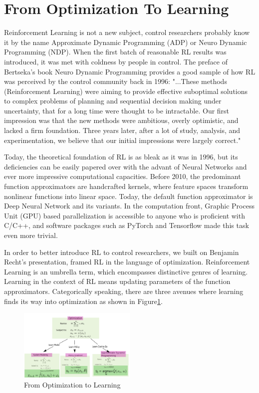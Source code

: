 \documentclass[journal]{IEEEtran}
\begin{document}
\section{From Optimization To Learning}

Reinforcement Learning is not a new subject, control researchers probably know it by the name Approximate Dynamic Programming (ADP) or Neuro Dynamic Programming (NDP). When the first batch of reasonable RL results was introduced, it was met with coldness by people in control. The preface of Bertseka's book Neuro Dynamic Programming provides a good sample of how RL was perceived by the control community back in 1996: "...These methods (Reinforcement Learning) were aiming to provide effective suboptimal solutions to complex problems of planning and sequential decision making under uncertainty, that for a long time were thought to be intractable. Our first impression was that the new methods were ambitious, overly optimistic, and lacked a firm foundation. Three years later, after a lot of study, analysis, and experimentation, we believe that our initial impressions were largely correct." \cite{Bertsekas1996NeuroDynamicP}

Today, the theoretical foundation of RL is as bleak as it was in 1996, but its deficiencies can be easily papered over with the advant of Neural Networks and ever more impressive computational capacities. Before 2010, the predominant function approximators are handcrafted kernels, where feature spaces transform nonlinear functions into linear space. Today, the default function approximator is Deep Neural Network and its variants. In the computation front, Graphic Process Unit (GPU) based parallelization is accessible to anyone who is proficient with C/C++\cite{Nickolls2008ScalablePP}, and software packages such as PyTorch\cite{Paszke2017AutomaticDI} and Tensorflow\cite{Abadi2016TensorFlowAS} made this task even more trivial.

In order to better introduce RL to control researchers, we built on Benjamin Recht's presentation\cite{Recht2018ATO}, framed RL in the language of optimization. Reinforcement Learning is an umbrella term, which encompasses distinctive genres of learning. Learning in the context of RL means updating parameters of the function approximators. Categorically speaking, there are three avenues where learning finds its way into optimization as shown in Figure\ref{fig:1}. 
\begin{figure}
    \centering
    \includegraphics[width=0.5\textwidth]{Control.png}
    \caption{From Optimization to Learning}
    \label{fig:1}
\end{figure}
\end{document}
